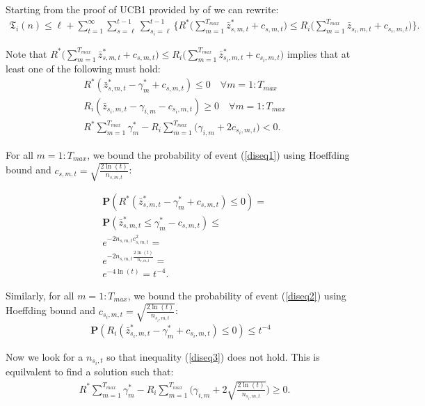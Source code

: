 Starting from the proof of UCB1 provided by of \cite{auer2002finite} we can rewrite:
\begin{align}
	\mathfrak{T}_i(n) \leq \ell + \sum_{t=1}^\infty \sum_{s=\ell}^{t-1} \sum_{s_i=\ell}^{t-1} \Biggl\{ R^*\Bigg(\sum_{m=1}^{T_{max}}\bar{z}^*_{s,m,t} + c_{s,m,t}\Bigg) \le R_i\Bigg(\sum_{m=1}^{T_{max}}\bar{z}_{s_i,m,t} + c_{s_i,m,t}\Bigg) \Biggl\}. 
\end{align}

Note that $R^*\big(\sum_{m=1}^{T_{max}}\bar{z}^*_{s,m,t} + c_{s,m,t}\big) \le R_i\big(\sum_{m=1}^{T_{max}}\bar{z}^*_{s_i,m,t} + c_{s_i,m,t}\big)$ implies that at least one of the following must hold:
\begin{align}
	&R^*(\bar{z}^*_{s,m,t} - \gamma^*_m + c_{s,m,t}) \le 0 \quad \forall m=1:T_{max} \label{diseq1}\\
	&R_i(\bar{z}_{s_i,m,t} - \gamma_{i,m} - c_{s_i,m,t}) \ge 0 \quad \forall m=1:T_{max} \label{diseq2}\\
	&R^*\sum_{m=1}^{T_{max}}\gamma^*_{m} - R_i \sum_{m=1}^{T_{max}}\Bigg( \gamma_{i,m} +2c_{s_i,m,t}\Bigg) < 0 \label{diseq3}.
\end{align}

For all $m=1:T_{max}$, we bound the probability of event (\ref{diseq1}) using Hoeffding bound and $c_{s,m,t}=\sqrt{\frac{2\ln(t)}{n_{s,m,t}}}$:

\begin{align}
	&\mathbf{P}(R^*(\bar{z}^*_{s,m,t} - \gamma^*_m + c_{s,m,t}) \le 0) = \nonumber\\
	&\mathbf{P}(\bar{z}^*_{s,m,t} \le \gamma^*_m - c_{s,m,t}) \le \nonumber\\
	&e^{-2 n_{s,m,t} c^2_{s,m,t}} = \nonumber\\
	&e^{-2 n_{s,m,t} \frac{2\ln(t)}{n_{s,m,t}}} = \nonumber\\
	&e^{-4\ln(t)} = t^{-4}.
\end{align}

Similarly, for all $m=1:T_{max}$, we bound the probability of event (\ref{diseq2}) using Hoeffding bound and $c_{s_i,m,t}=\sqrt{\frac{2\ln(t)}{n_{s_i,m,t}}}$:
\begin{align}
	\mathbf{P}(R_i(\bar{z}^*_{s_i,m,t} - \gamma^*_m + c_{s_i,m,t}) \le 0) \le t^{-4}
\end{align}

Now we look for a $n_{s_i,t}$ so that inequality (\ref{diseq3}) does not hold. This is equilvalent to find a solution such that:
\begin{align}
	&R^*\sum_{m=1}^{T_{max}}\gamma^*_{m} - R_i \sum_{m=1}^{T_{max}}\Bigg( \gamma_{i,m} +2\sqrt{\frac{2\ln(t)}{n_{s_i,m,t}}}\Bigg) \ge 0 \label{ineq_mag}.
\end{align}

